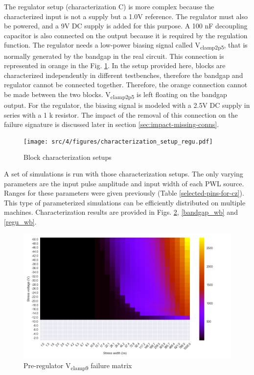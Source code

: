%
The regulator setup (characterization C) is more complex because the characterized input is not a supply but a 1.0V reference.
The regulator must also be powered, and a 9V DC supply is added for this purpose.
A 100 nF decoupling capacitor is also connected on the output because it is required by the regulation function.
The regulator needs a low-power biasing signal called V\textsubscript{clamp2p5}, that is normally generated by the bandgap in the real circuit.
This connection is represented in orange in the Fig. \ref{fig:block_function_cz_regu}.
In the setup provided here, blocks are characterized independently in different testbenches, therefore the bandgap and regulator cannot be connected together.
Therefore, the orange connection cannot be made between the two blocks.
V\textsubscript{clamp2p5} is left floating on the bandgap output.
For the regulator, the biasing signal is modeled with a 2.5V DC supply in series with a 1 k\textOmega{} resistor.
The impact of the removal of this connection on the failure signature is discussed later in section \ref{sec:impact-missing-conns}.

\begin{figure}[!h]
  \centering
  \texttt{[image: src/4/figures/characterization\_setup\_regu.pdf]}
  \caption{Block characterization setups}
  \label{fig:block_function_cz_regu}
\end{figure}

A set of simulations is run with those characterization setups.
The only varying parameters are the input pulse amplitude and input width of each PWL source.
Ranges for these parameters were given previously (Table \ref{selected-pins-for-cz}).
This type of parameterized simulations can be efficiently distributed on multiple machines.
Characterization results are provided in Figs. \ref{pre_regu_wb}, \ref{bandgap_wb} and \ref{regu_wb}.

\begin{figure}[!h]
  \centering
  \includegraphics[width=\textwidth]{src/4/figures/preregulator_cz.png}
  \caption{Pre-regulator V\textsubscript{clamp9} failure matrix}
  \label{pre_regu_wb}
\end{figure}

